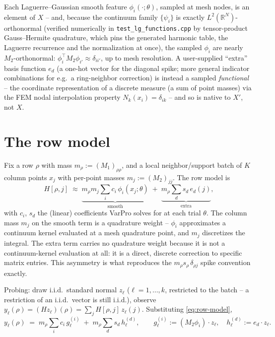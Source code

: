 \documentclass[11pt]{article}
\newcommand{\Mone}{M_1}
\newcommand{\Mtwo}{M_2}
\begin{document}
Each Laguerre--Gaussian smooth feature $\phi_i(\cdot;\theta)$, sampled at
mesh nodes, is an element of $X$ -- and, because the continuum family
$\{\psi_i\}$ is exactly $L^2(\mathbb{R}^N)$-orthonormal (verified numerically
in \texttt{test\_lg\_functions.cpp} by tensor-product Gauss--Hermite
quadrature, which pins the generated harmonic table, the Laguerre recurrence
and the normalization at once), the
sampled $\phi_i$ are nearly $\Mtwo$-orthonormal: $\phi_i^\top \Mtwo \phi_{i'}
\approx \delta_{ii'}$, up to mesh resolution. A user-supplied ``extra''
basis function $e_d$ (a one-hot vector for the diagonal spike; more general
indicator combinations for e.g.\ a ring-neighbor correction) is instead a
sampled \emph{functional} -- the coordinate representation of a discrete
measure (a sum of point masses) via the FEM nodal interpolation property
$N_k(x_i) = \delta_{ik}$ -- and so is native to $X'$, not $X$.

\section{The row model}

Fix a row $\rho$ with mass $m_\rho := (\Mone)_{\rho\rho}$, and a local
neighbor/support batch of $K$ column points $x_j$ with per-point masses
$m_j := (\Mtwo)_{jj}$. The row model is
\begin{equation}
H[\rho,j] \;\approx\; \underbrace{m_\rho m_j \sum_i c_i\, \phi_i(x_j;\theta)}_{\text{smooth}}
\;+\; \underbrace{m_\rho \sum_d s_d\, e_d(j)}_{\text{extra}},
\label{eq:row-model}
\end{equation}
with $c_i$, $s_d$ the (linear) coefficients VarPro solves for at each trial
$\theta$. The column mass $m_j$ on the smooth term is a quadrature weight --
$\phi_i$ approximates a continuum kernel evaluated at a mesh quadrature
point, and $m_j$ discretizes the integral. The extra term carries no
quadrature weight because it is not a continuum-kernel evaluation at all: it
is a direct, discrete correction to specific matrix entries. This asymmetry
is what reproduces the $m_\rho s_\rho\,\delta_{\rho j}$ spike convention
exactly.

Probing: draw i.i.d.\ standard normal $z_\ell$ ($\ell = 1,\dots,k$,
restricted to the batch -- a restriction of an i.i.d.\ vector is still
i.i.d.), observe $y_\ell(\rho) = (Hz_\ell)(\rho) = \sum_j H[\rho,j]\,
z_\ell(j)$. Substituting \eqref{eq:row-model},
\begin{equation}
y_\ell(\rho) \;=\; m_\rho \sum_i c_i\, g_\ell^{(i)} \;+\; m_\rho \sum_d s_d\, h_\ell^{(d)},
\qquad
g_\ell^{(i)} := (\Mtwo \phi_i)\cdot z_\ell, \quad h_\ell^{(d)} := e_d \cdot z_\ell.
\label{eq:probe-eq}
\end{equation}
\end{document}
